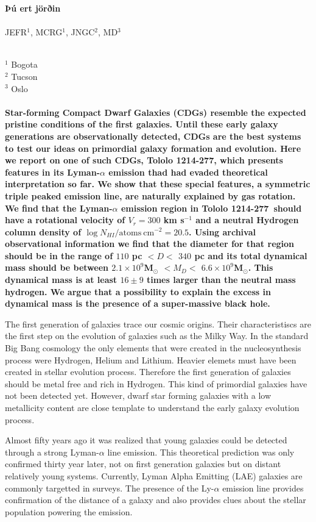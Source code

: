 \documentclass[a4paper, usenatbib, 12pt]{article}
\newcommand{\tol}{Tololo 1214-277}
\begin{document}
\pagestyle{empty}
\noindent
\textbf{Þú ert jörðin}
\\
\\
JEFR$^{1}$, MCRG$^1$, JNGC$^2$, MD$^3$
\\
\\
\scriptsize
{$^1$ Bogota
\\
$^2$ Tucson
\\
$^3$ Oslo
\normalsize
\\
\\
\textbf{
Star-forming Compact Dwarf Galaxies (CDGs) resemble the expected pristine conditions of the first galaxies.  
Until these early galaxy generations are observationally
detected, CDGs are the best systems to test our ideas on primordial
galaxy formation and evolution.  
Here we report on one of such CDGs, \tol, which presents
features in its Lyman-$\alpha$ emission thad had evaded theoretical
interpretation so far. 
We show that these special features, a symmetric triple peaked
emission line, are naturally explained by gas rotation.  
We find that the Lyman-$\alpha$ emission region in \tol\ should
have a rotational velocity of $V_{r}=300$ km s$^{-1}$ and a neutral
Hydrogen column density of $\log N_{HI} / \mathrm{atoms\ cm}^{-2} =
  20.5$.   
Using archival observational information we find that
the diameter for that region should be in the range of
$110$ pc $<D<$ $340$ pc and its total dynamical mass 
should be between $2.1\times 10^{9}$M$_{\odot}$ $<M_D<$  $6.6\times
10^{9}$M$_{\odot}$. 
This dynamical mass is at least $16\pm 9$ times
larger than the neutral mass hydrogen.
We argue that a possibility to explain the excess in
dynamical mass is the presence of a super-massive black hole. }



The first generation of galaxies trace our cosmic origins. 
Their characteristiscs are the first step on the evolution of galaxies
such as the Milky Way.
In the standard Big Bang cosmology the only elements that were
created in the nucleosynthesis process were Hydrogen, Helium and
Lithium. 
Heavier elemets must have been created in stellar evolution process. 
Therefore the first generation of
galaxies should be metal free and rich in Hydrogen. 
This kind of primordial galaxies have not been detected yet. 
However, dwarf star forming galaxies with a low metallicity content
are close template to understand the early galaxy evolution process. 

Almost fifty years ago \cite{PartridgePeebles} it was realized that
young galaxies could be detected through a strong Lyman-$\alpha$ line
emission.  
This theoretical prediction was only confirmed thirty year later,  not
on first generation galaxies but on distant relatively young systems. 
Currently, Lyman Alpha Emitting (LAE) galaxies are commonly targetted
in surveys. 
The presence of the Ly-$\alpha$ emission line provides confirmation of
the distance of a galaxy and also provides clues about the stellar
population powering the emission. 

}
\end{document}
